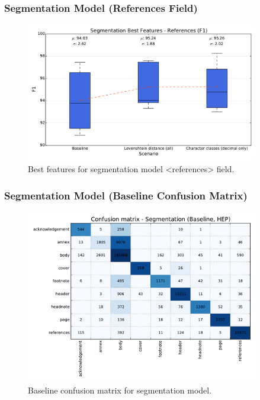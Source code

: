 \documentclass{beamer}
\begin{document}
\begin{frame}
\frametitle{Segmentation Model (References Field)}
\begin{figure}[h]
\center
\includegraphics[width=4in]{Figures/references.pdf}
\caption{Best features for segmentation model <references> field.}
\end{figure}
\end{frame}


\begin{frame}
\frametitle{Segmentation Model (Baseline Confusion Matrix)}
\begin{figure}[h]
\center
\includegraphics[width=4in]{Figures/baseline_confusion_segmentation.pdf}
\caption{Baseline confusion matrix for segmentation model.}
\end{figure}
\end{frame}

\end{document}
